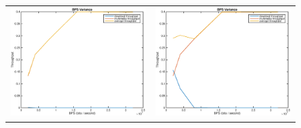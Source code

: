 \begin{figure}
\begin{center}
\begin{tabular}{cc}
\includegraphics[scale=0.35]{../../src/fig-simulation_download_multimedia-bps-1_1_10_10_12000.eps} & \includegraphics[scale=0.35]{../../src/fig-simulation_download_multimedia-bps-1_1_5_25_12000.eps} \\ 

\end{tabular}
\end{center}
\end{figure}
